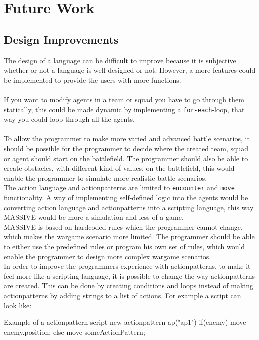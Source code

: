 \chapter{Future Work}
\section{Design Improvements}
The design of a language can be difficult to improve because it is subjective whether or not a language is well designed or not. However, a more features could be implemented to provide the users with more functions.\\ \\
If you want to modify agents in a team or squad you have to go through them statically, this could be made dynamic by implementing a \texttt{for-each}-loop, that way you could loop through all the agents.\\
\\
To allow the programmer to make more varied and advanced battle scenarios, it should be possible for the programmer to decide where the created team, squad or agent should start on the battlefield. The programmer should also be able to create obstacles, with different kind of values, on the battlefield, this would enable the programmer to simulate more realistic battle scenarios.\\

The action language and actionpatterns are limited to \texttt{encounter} and \texttt{move} functionality. A way of implementing self-defined logic into the agents would be converting action language and actionpatterns into a scripting language, this way MASSIVE would be more a simulation and less of a game.\\

MASSIVE is based on hardcoded rules which the programmer cannot change, which makes the wargame scenario more limited. The programmer should be able to either use the predefined rules or program his own set of rules, which would enable the programmer to design more complex wargame scenarios. \\

In order to improve the programmers experience with actionpatterns, to make it feel more like a scripting language, it is possible to change the way actionpatterns are created. This can be done by creating conditions and loops instead of making actionpatterns by adding strings to a list of actions. For example a script can look like:
\begin{source}{Example of a actionpattern script}{}
new actionpattern ap("ap1")
{
	if(enemy)
	{
		move enemy.position;
	}
	else
	{
		move someActionPattern;
	}
}
\end{source}


